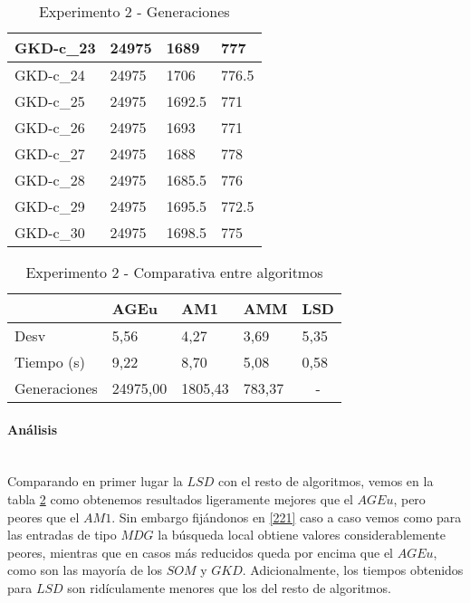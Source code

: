 \documentclass[11pt,a4paper]{article}
\begin{document}
\begin{table}[H]
\begin{tabular}{l|l|l|l|}
			\multicolumn{1}{|l|}{GKD-c\_23} & 24975 & 1689   & 777   \\ \hline
			\multicolumn{1}{|l|}{GKD-c\_24} & 24975 & 1706   & 776.5 \\ \hline
			\multicolumn{1}{|l|}{GKD-c\_25} & 24975 & 1692.5 & 771   \\ \hline
			\multicolumn{1}{|l|}{GKD-c\_26} & 24975 & 1693   & 771   \\ \hline
			\multicolumn{1}{|l|}{GKD-c\_27} & 24975 & 1688   & 778   \\ \hline
			\multicolumn{1}{|l|}{GKD-c\_28} & 24975 & 1685.5 & 776   \\ \hline
			\multicolumn{1}{|l|}{GKD-c\_29} & 24975 & 1695.5 & 772.5 \\ \hline
			\multicolumn{1}{|l|}{GKD-c\_30} & 24975 & 1698.5 & 775   \\ \hline
		\end{tabular}
		\caption{ Experimento 2 - Generaciones }
		\label{223}
	\end{table}
	
	\begin{table}[H]
		\centering
		\begin{tabular}{l|l|l|l|l|}
			\cline{2-5}
			& AGEu     & AM1     & AMM    & LSD                    \\ \hline
			\multicolumn{1}{|l|}{Desv}         & 5,56     & 4,27    & 3,69   & 5,35                   \\ \hline
			\multicolumn{1}{|l|}{Tiempo (s)}   & 9,22     & 8,70    & 5,08   & 0,58                   \\ \hline
			\multicolumn{1}{|l|}{Generaciones} & 24975,00 & 1805,43 & 783,37 & \multicolumn{1}{c|}{-} \\ \hline
		\end{tabular}
		\caption{ Experimento 2 - Comparativa entre algoritmos }
		\label{224}
	\end{table}
	
	\paragraph{ Análisis } \ \\
	
	Comparando en primer lugar la $LSD$ con el resto de algoritmos, vemos en la tabla \ref{224} como obtenemos resultados ligeramente mejores que el $AGEu$, pero peores que el $AM1$. Sin embargo fijándonos en \ref{221} caso a caso vemos como para las entradas de tipo $MDG$ la búsqueda local obtiene valores considerablemente peores, mientras que en casos más reducidos queda por encima que el $AGEu$, como son las mayoría de los $SOM$ y $GKD$. Adicionalmente, los tiempos obtenidos para $LSD$ son ridículamente menores que los del resto de algoritmos. \\ 
	
\end{document}
